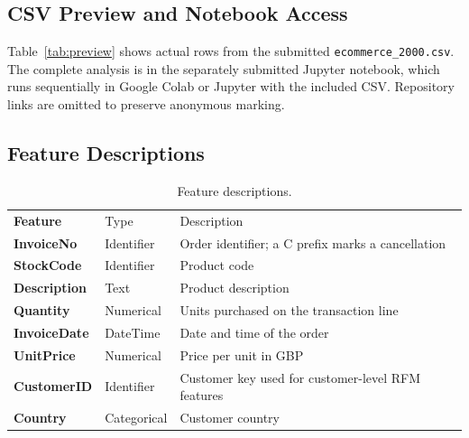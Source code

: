 \documentclass[11pt,a4paper]{article}
\begin{document}
\subsection{CSV Preview and Notebook Access}
Table~\ref{tab:preview} shows actual rows from the submitted \texttt{ecommerce\_2000.csv}. The complete analysis is in the separately submitted Jupyter notebook, which runs sequentially in Google Colab or Jupyter with the included CSV. Repository links are omitted to preserve anonymous marking.

\begin{table}[H]
\centering
\caption{Preview of the submitted CSV dataset.}\label{tab:preview}
\scriptsize
{}
\end{table}
\clearpage

\subsection{Feature Descriptions}
\begin{table}[H]
\centering
\caption{Feature descriptions.}\label{tab:features}
\begin{tabularx}{\textwidth}{>{\bfseries}p{} p{} X}
\rowcolor{bcuBlue}\color{white}Feature & \color{white}Type & \color{white}Description\\
InvoiceNo & Identifier & Order identifier; a C prefix marks a cancellation\\
StockCode & Identifier & Product code\\
Description & Text & Product description\\
Quantity & Numerical & Units purchased on the transaction line\\
InvoiceDate & DateTime & Date and time of the order\\
UnitPrice & Numerical & Price per unit in GBP\\
CustomerID & Identifier & Customer key used for customer-level RFM features\\
Country & Categorical & Customer country\\
\end{tabularx}
\end{table}
\end{document}
